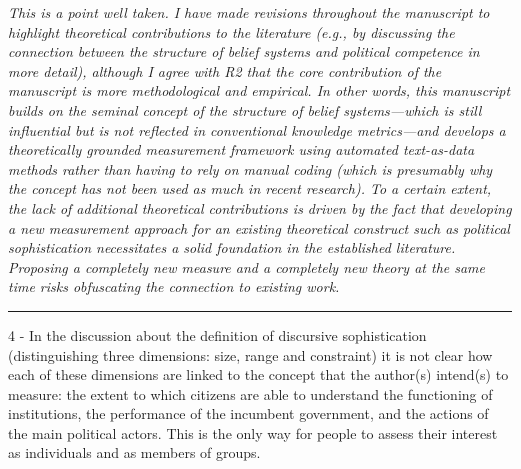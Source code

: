 \textit{This is a point well taken. I have made revisions throughout the manuscript to highlight theoretical contributions to the literature (e.g., by discussing the connection between the structure of belief systems and political competence in more detail), although I agree with R2 that the core contribution of the manuscript is more methodological and empirical. In other words, this manuscript builds on the seminal concept of the structure of belief systems---which is still influential but is not reflected in conventional knowledge metrics---and develops a theoretically grounded measurement framework using automated text-as-data methods rather than having to rely on manual coding (which is presumably why the concept has not been used as much in recent research). To a certain extent, the lack of additional theoretical contributions is driven by the fact that developing a new measurement approach for an existing theoretical construct such as political sophistication necessitates a solid foundation in the established literature. Proposing a completely new measure {\normalfont and} a completely new theory at the same time risks obfuscating the connection to existing work.}


\rule{\linewidth}{.01cm}

4 - In the discussion about the definition of discursive sophistication (distinguishing three dimensions: size, range and constraint) it is not clear how each of these dimensions are linked to the concept that the author(s) intend(s) to measure: the extent to which citizens are able to understand the functioning of institutions, the performance of the incumbent government, and the actions of the main political actors. This is the only way for people to assess their interest as individuals and as members of groups.

